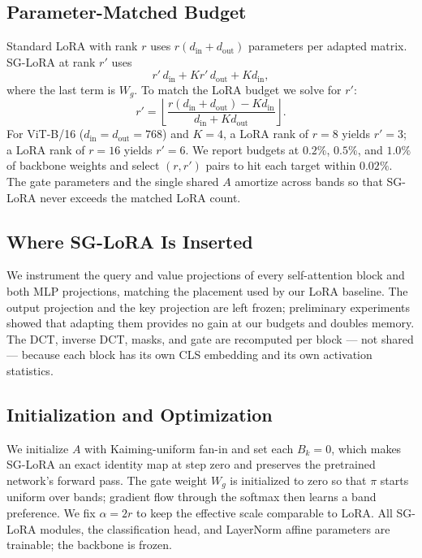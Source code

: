\documentclass{article}
\begin{document}
\subsection{Parameter-Matched Budget}

Standard LoRA with rank $r$ uses $r(d_{\text{in}} + d_{\text{out}})$ parameters per adapted matrix. SG-LoRA at rank $r'$ uses
\begin{equation}
r'\, d_{\text{in}} + K r'\, d_{\text{out}} + K d_{\text{in}},
\end{equation}
where the last term is $W_g$. To match the LoRA budget we solve for $r'$:
\begin{equation}
r' = \left\lfloor \frac{r(d_{\text{in}} + d_{\text{out}}) - K d_{\text{in}}}{d_{\text{in}} + K d_{\text{out}}} \right\rfloor.
\end{equation}
For ViT-B/16 ($d_{\text{in}} = d_{\text{out}} = 768$) and $K=4$, a LoRA rank of $r=8$ yields $r' = 3$; a LoRA rank of $r=16$ yields $r' = 6$. We report budgets at $0.2\%$, $0.5\%$, and $1.0\%$ of backbone weights and select $(r, r')$ pairs to hit each target within $0.02\%$. The gate parameters and the single shared $A$ amortize across bands so that SG-LoRA never exceeds the matched LoRA count.

\subsection{Where SG-LoRA Is Inserted}

We instrument the query and value projections of every self-attention block and both MLP projections, matching the placement used by our LoRA baseline. The output projection and the key projection are left frozen; preliminary experiments showed that adapting them provides no gain at our budgets and doubles memory. The DCT, inverse DCT, masks, and gate are recomputed per block — not shared — because each block has its own CLS embedding and its own activation statistics.

\subsection{Initialization and Optimization}

We initialize $A$ with Kaiming-uniform fan-in and set each $B_k = 0$, which makes SG-LoRA an exact identity map at step zero and preserves the pretrained network's forward pass. The gate weight $W_g$ is initialized to zero so that $\pi$ starts uniform over bands; gradient flow through the softmax then learns a band preference. We fix $\alpha = 2r$ to keep the effective scale comparable to LoRA. All SG-LoRA modules, the classification head, and LayerNorm affine parameters are trainable; the backbone is frozen.
\end{document}
